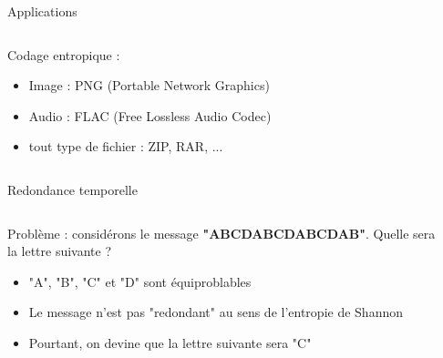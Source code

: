 \documentclass[9pt, aspectratio=169]{beamer}
\begin{document}
\begin{frame}{Applications} %
\begin{columns}
   \begin{column}{0.6\textwidth}
		Codage entropique :
        \begin{itemize}
            \item Image : PNG (Portable Network Graphics)
            \item Audio : FLAC (Free Lossless Audio Codec)
            \item tout type de fichier : ZIP, RAR, ...
        \end{itemize}
        
   \end{column}
   \begin{column}{0.39\textwidth}
		
   \end{column}
\end{columns}
\end{frame}

\begin{frame}{Redondance temporelle} %

\begin{columns}
   \begin{column}{0.6\textwidth}

        Problème : considérons le message \textbf{"ABCDABCDABCDAB"}. Quelle sera la lettre suivante ?
        \begin{itemize}
            \item "A", "B", "C" et "D" sont équiproblables
            \item Le message n'est pas "redondant" au sens de l'entropie de Shannon
            \item Pourtant, on devine que la lettre suivante sera "C"
        
        \end{itemize}
        
   \end{column}
   \begin{column}{0.39\textwidth}
		
   \end{column}
\end{columns}
\end{frame}
\end{document}
